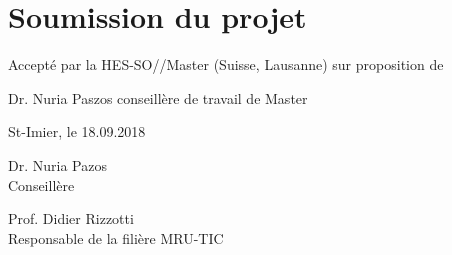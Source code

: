 \chapter*{Soumission du projet}
Accepté par la HES-SO//Master (Suisse, Lausanne) sur proposition de

\vspace{0.5cm}
Dr. Nuria Paszos conseillère de travail de Master

\vspace{2cm}
St-Imier, le 18.09.2018

\vspace{1.5cm}
\begin{minipage}[t]{0.5\textwidth}
	\raggedright
	Dr. Nuria Pazos\\
	Conseillère
\end{minipage}%
\begin{minipage}[t]{0.45\textwidth}
	Prof. Didier Rizzotti\\
	Responsable de la filière MRU-TIC
\end{minipage}



